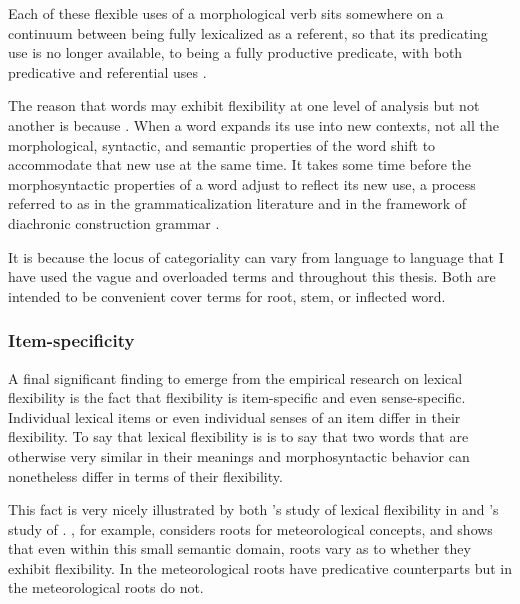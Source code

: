 \noindent Each of these flexible uses of a morphological verb sits somewhere on a continuum between being fully lexicalized as a referent, so that its predicating use is no longer available, to being a fully productive predicate, with both predicative and referential uses \parencite[413]{Mithun2000}.

The reason that words may exhibit flexibility at one level of analysis but not another is because . When a word expands its use into new contexts, not all the morphological, syntactic, and semantic properties of the word shift to accommodate that new use at the same time. It takes some time before the morphosyntactic properties of a word adjust to reflect its new use, a process referred to as  in the grammaticalization literature \parencite{DeSmet2012} and  in the framework of diachronic construction grammar \parencite[27]{HopperTraugott2003}.

It is because the locus of categoriality can vary from language to language that I have used the vague and overloaded terms  and  throughout this thesis. Both are intended to be convenient cover terms for root, stem, or inflected word.

\subsubsection{Item-specificity}
\label{sec:2.3.2.4}

A final significant finding to emerge from the empirical research on lexical flexibility is the fact that flexibility is item-specific and even sense-specific. Individual lexical items or even individual senses of an item differ in their flexibility. To say that lexical flexibility is  is to say that two words that are otherwise very similar in their meanings and morphosyntactic behavior can nonetheless differ in terms of their flexibility.

This fact is very nicely illustrated by both \citeauthor{Mithun2017}'s study of lexical flexibility in  and \citeauthor{Creissels2017}'s study of . \textcite[163--164]{Mithun2017}, for example, considers roots for meteorological concepts, and shows that even within this small semantic domain, roots vary as to whether they exhibit flexibility. In  the meteorological roots have predicative counterparts but in  the meteorological roots do not.

